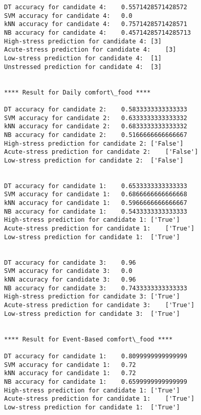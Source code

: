 \begin{lstlisting}
DT accuracy for candidate 4:	0.5571428571428572
SVM accuracy for candidate 4:	0.0
kNN accuracy for candidate 4:	0.7571428571428571
NB accuracy for candidate 4:	0.45714285714285713
High-stress prediction for candidate 4:	[3]
Acute-stress prediction for candidate 4:	[3]
Low-stress prediction for candidate 4:	[1]
Unstressed prediction for candidate 4:	[3]


**** Result for Daily comfort\_food ****

DT accuracy for candidate 2:	0.5833333333333333
SVM accuracy for candidate 2:	0.6333333333333332
kNN accuracy for candidate 2:	0.6833333333333332
NB accuracy for candidate 2:	0.5166666666666667
High-stress prediction for candidate 2:	['False']
Acute-stress prediction for candidate 2:	['False']
Low-stress prediction for candidate 2:	['False']


DT accuracy for candidate 1:	0.6533333333333333
SVM accuracy for candidate 1:	0.6866666666666668
kNN accuracy for candidate 1:	0.5966666666666667
NB accuracy for candidate 1:	0.5433333333333333
High-stress prediction for candidate 1:	['True']
Acute-stress prediction for candidate 1:	['True']
Low-stress prediction for candidate 1:	['True']


DT accuracy for candidate 3:	0.96
SVM accuracy for candidate 3:	0.0
kNN accuracy for candidate 3:	0.96
NB accuracy for candidate 3:	0.7433333333333333
High-stress prediction for candidate 3:	['True']
Acute-stress prediction for candidate 3:	['True']
Low-stress prediction for candidate 3:	['True']


**** Result for Event-Based comfort\_food ****

DT accuracy for candidate 1:	0.8099999999999999
SVM accuracy for candidate 1:	0.72
kNN accuracy for candidate 1:	0.72
NB accuracy for candidate 1:	0.6599999999999999
High-stress prediction for candidate 1:	['True']
Acute-stress prediction for candidate 1:	['True']
Low-stress prediction for candidate 1:	['True']
\end{lstlisting}

\bigskip
